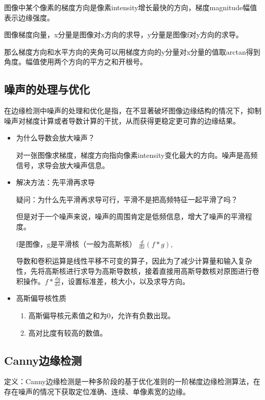 \documentclass[UTF8]{ctexart}
\begin{document}
图像中某个像素的梯度方向是像素intensity增长最快的方向，梯度magnitude幅值表示边缘强度。

图像梯度向量，x分量是图像对x方向的求导，y分量是图像f对y方向的求导。

那么梯度方向和水平方向的夹角可以用梯度方向的y分量对x分量的值取arctan得到角度。幅值使用两个方向的平方之和开根号。

\subsection{噪声的处理与优化}
在边缘检测中噪声的处理和优化是指，在不显著破坏图像边缘结构的情况下，抑制噪声对梯度计算或者导数计算的干扰，从而获得更稳定更可靠的边缘结果。

\begin{itemize}
    \item 为什么导数会放大噪声？
    
    对一张图像求梯度，梯度方向指向像素intensity变化最大的方向。噪声是高频信号，求导会放大噪声信息。

    \item 解决方法：先平滑再求导
    
    疑问：为什么先平滑再求导可行，平滑不是把高频特征一起平滑了吗？

    但是对于一个噪声来说，噪声的周围肯定是低频信息，增大了噪声的平滑程度。
    
    f是图像，g是平滑核（一般为高斯核）
    $\frac{d}{dx}(f*g)$,

    导数和卷积运算是线性平移不可变的算子，因此为了减少计算量和输入复杂性，先将高斯核进行求导为高斯导数核，接着直接用高斯导数核对原图进行卷积操作。$f*\frac{dg}{dx}$，设置标准差，核大小，以及求导方向。

    \item 高斯偏导核性质
    \begin{enumerate}
        \item 高斯偏导核元素值之和为0，允许有负数出现。
        \item 高对比度有较高的数值。
    \end{enumerate}
    

\end{itemize}

\subsection{Canny边缘检测}
定义：Canny边缘检测是一种多阶段的基于优化准则的一阶梯度边缘检测算法，在存在噪声的情况下获取定位准确、连续、单像素宽的边缘。
\end{document}
